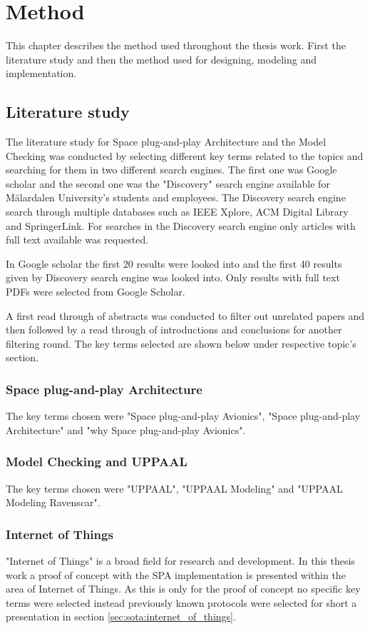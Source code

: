 \chapter{Method}\label{ch:method}
This chapter describes the method used throughout the thesis work. First
the literature study and then the method used for designing, modeling and
implementation.

\section{Literature study}
The literature study for Space plug-and-play Architecture and the Model
Checking was conducted by selecting different key terms related to the topics
and searching for them in two different search engines. The first one was
Google scholar and the second one was the "Discovery" search engine available
for M\"{a}lardalen University's students and employees. The Discovery search engine
search through multiple databases such as IEEE Xplore, ACM Digital Library and
SpringerLink. For searches in the Discovery search engine only articles with
full text available was requested.

In Google scholar the first 20 results were looked into and the first 40
results given by Discovery search engine was looked into. Only results with
full text PDFs were selected from Google Scholar.

A first read through of abstracts was conducted to filter out unrelated
papers and then followed by a read through of introductions and conclusions for
another filtering round. The key terms selected are shown below under
respective topic's section.

\subsection{Space plug-and-play Architecture}
The key terms chosen were "Space plug-and-play Avionics", "Space
plug-and-play Architecture" and "why Space plug-and-play Avionics".

\subsection{Model Checking and UPPAAL}
The key terms chosen were "UPPAAL", "UPPAAL Modeling" and "UPPAAL Modeling
Ravenscar".

\subsection{Internet of Things}
"Internet of Things" is a broad field for research and development. In
this thesis work a proof of concept with the SPA implementation is
presented within the area of Internet of Things. As this is only for the proof
of concept no specific key terms were selected instead previously known
protocols were selected for short a presentation in section
\ref{sec:sota:internet_of_things}.

